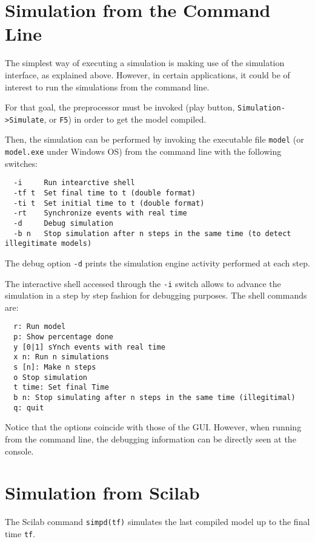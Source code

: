 \section{Simulation from the Command Line}
The simplest way of executing a simulation is making use of the simulation interface, as explained above. However, in certain applications, it could be of interest to run the simulations from the command line.

For that goal, the preprocessor must be invoked (play button,  \verb"Simulation->Simulate", or \verb"F5") in order to get the model compiled.

Then, the simulation can be performed by invoking the executable file \verb"model" (or \verb"model.exe" under Windows OS) from the command line with the following switches:
\begin{verbatim}
  -i     Run intearctive shell
  -tf t  Set final time to t (double format)
  -ti t  Set initial time to t (double format)
  -rt    Synchronize events with real time
  -d     Debug simulation
  -b n   Stop simulation after n steps in the same time (to detect illegitimate models)
\end{verbatim}
The debug option \verb"-d" prints the simulation engine activity performed at each step.

The interactive shell accessed through the \verb"-i" switch allows to advance the simulation in a step by step fashion for debugging purposes. The shell commands are:
\begin{verbatim}
  r: Run model
  p: Show percentage done
  y [0|1] sYnch events with real time
  x n: Run n simulations
  s [n]: Make n steps
  o Stop simulation
  t time: Set final Time
  b n: Stop simulating after n steps in the same time (illegitimal)
  q: quit
\end{verbatim}
Notice that the options coincide with those of the GUI. However, when running from the command line, the debugging information can be directly seen at the console.

\section{Simulation from Scilab}
The Scilab command \verb"simpd(tf)" simulates the last compiled model up to the final time \verb"tf".


